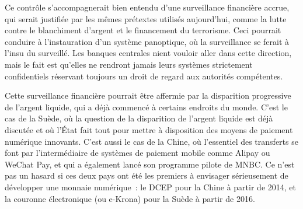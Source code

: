 Ce contrôle s'accompagnerait bien entendu d'une surveillance financière accrue, qui serait justifiée par les mêmes prétextes utilisés aujourd'hui, comme la lutte contre le blanchiment d'argent et le financement du terrorisme. Ceci pourrait conduire à l'instauration d'un système panoptique, où la surveillance se ferait à l'insu du surveillé. Les banques centrales nient vouloir aller dans cette direction, mais le fait est qu'elles ne rendront jamais leurs systèmes strictement confidentiels réservant toujours un droit de regard aux autorités compétentes.

Cette surveillance financière pourrait être affermie par la disparition progressive de l'argent liquide, qui a déjà commencé à certains endroits du monde. C'est le cas de la Suède, où la question de la disparition de l'argent liquide est déjà discutée et où l'État fait tout pour mettre à disposition des moyens de paiement numérique innovants. C'est aussi le cas de la Chine, où l'essentiel des transferts se font par l'intermédiaire de systèmes de paiement mobile comme Alipay ou WeChat Pay, et qui a également lancé son programme pilote de MNBC. Ce n'est pas un hasard si ces deux pays ont été les premiers à envisager sérieusement de développer une monnaie numérique~: le DCEP pour la Chine à partir de 2014, et la couronne électronique (ou e-Krona) pour la Suède à partir de 2016.

